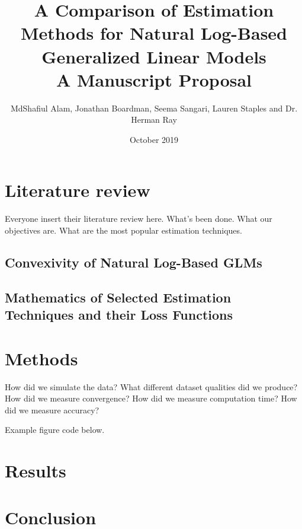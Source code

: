 \documentclass{article}
\begin{document}
\title{A Comparison of Estimation Methods for Natural Log-Based Generalized Linear Models\\
    \large A Manuscript Proposal}
\author{MdShafiul Alam, Jonathan Boardman, Seema Sangari, Lauren Staples and Dr. Herman Ray}
\date{October 2019}
\maketitle

\section{Literature review}
\indent Everyone insert their literature review here.  What's been done.  What our objectives are.  What are the most popular estimation techniques.

\subsection{Convexivity of Natural Log-Based GLMs}
\subsection{Mathematics of Selected Estimation Techniques and their Loss Functions}

\section{Methods}
How did we simulate the data?  What different dataset qualities did we produce?
How did we measure convergence?
How did we measure computation time?
How did we measure accuracy?

\medskip
\noindent Example figure code below.


\section{Results}
\section{Conclusion}

\printbibliography
\end{document}
